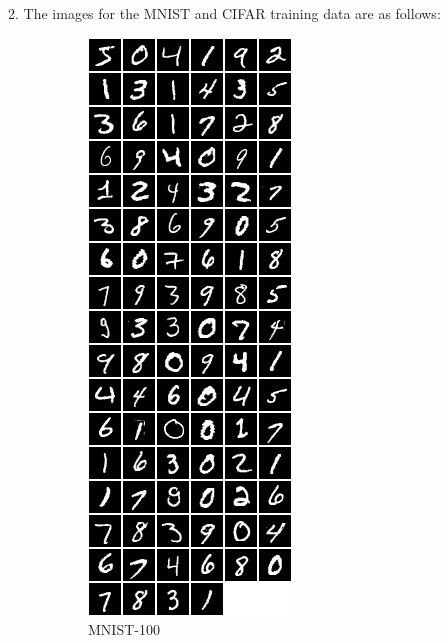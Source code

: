 \documentclass[11pt]{article}
\begin{document}
\maketitle

2. The images for the MNIST and CIFAR training data are as follows:
\begin{figure}[H]
\begin{subfigure}{.5\textwidth}
\centering
\includegraphics[scale=0.5]{assign2/torch/mnist100.png}
\caption{MNIST-100 \label{fig1}}
\end{subfigure}
\begin{subfigure}{.5\textwidth}
\centering

\end{subfigure}
\end{figure}
\end{document}
